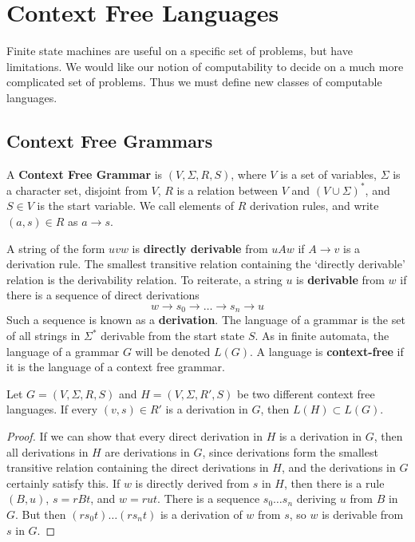 \chapter{Context Free Languages}

Finite state machines are useful on a specific set of problems, but have limitations. We would like our notion of computability to decide on a much more complicated set of problems. Thus we must define new classes of computable languages.

\section{Context Free Grammars}

\begin{definition}
    A {\bf Context Free Grammar} is $(V,\Sigma,R,S)$, where $V$ is a set of variables, $\Sigma$ is a character set, disjoint from $V$, $R$ is a relation between $V$ and $(V \cup \Sigma)^*$, and $S \in V$ is the start variable. We call elements of $R$ derivation rules, and write $(a,s) \in R$ as $a \rightarrow s$.
\end{definition}

A string of the form $uvw$ is {\bf directly derivable} from $uAw$ if $A \rightarrow v$ is a derivation rule. The smallest transitive relation containing the `directly derivable' relation is the derivability relation. To reiterate, a string $u$ is {\bf derivable} from $w$ if there is a sequence of direct derivations
%
\[ w \rightarrow s_0 \rightarrow \dots \rightarrow s_n \rightarrow u \]
%
Such a sequence is known as a {\bf derivation}. The language of a grammar is the set of all strings in $\Sigma^*$ derivable from the start state $S$. As in finite automata, the language of a grammar $G$ will be denoted $L(G)$. A language is {\bf context-free} if it is the language of a context free grammar.

\begin{lemma}
    Let $G = (V,\Sigma,R,S)$ and $H = (V,\Sigma,R',S)$ be two different context free languages. If every $(v,s) \in R'$ is a derivation in $G$, then $L(H) \subset L(G)$.
\end{lemma}
\begin{proof}
    If we can show that every direct derivation in $H$ is a derivation in $G$, then all derivations in $H$ are derivations in $G$, since derivations form the smallest transitive relation containing the direct derivations in $H$, and the derivations in $G$ certainly satisfy this. If $w$ is directly derived from $s$ in $H$, then there is a rule $(B,u)$, $s = rBt$, and $w = rut$. There is a sequence $s_0 \dots s_n$ deriving $u$ from $B$ in $G$. But then $(rs_0t) \dots (rs_nt)$ is a derivation of $w$ from $s$, so $w$ is derivable from $s$ in $G$.
\end{proof}

